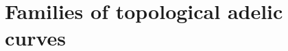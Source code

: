 \documentclass [11pt,reqno]{amsart}
\def\bC{{\mathbb{C}}}
\newcommand{\1}{\mathmybb{1}}
\def\cM{{\mathcal{M}}}
\def\cO{{\mathcal{O}}}
\def\hyb{\operatorname{hyb}}
\begin{document}

\section{Families of topological adelic curves}
\label{sec:families_topological_adelic_curves}
\end{document}
